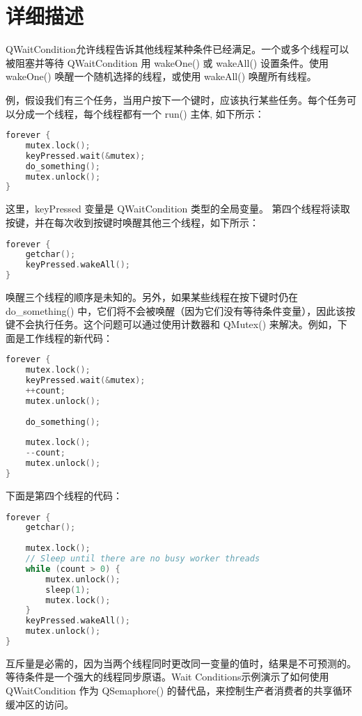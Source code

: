 \section{详细描述}

QWaitCondition允许线程告诉其他线程某种条件已经满足。一个或多个线程可以被阻塞并等待 QWaitCondition 用 wakeOne() 或 wakeAll() 设置条件。使用 wakeOne() 唤醒一个随机选择的线程，或使用 wakeAll() 唤醒所有线程。

例，假设我们有三个任务，当用户按下一个键时，应该执行某些任务。每个任务可以分成一个线程，每个线程都有一个 run() 主体, 如下所示：

\begin{lstlisting}[language=C++]
forever {
	mutex.lock();
	keyPressed.wait(&mutex);
	do_something();
	mutex.unlock();
}
\end{lstlisting}

这里，keyPressed 变量是 QWaitCondition 类型的全局变量。
第四个线程将读取按键，并在每次收到按键时唤醒其他三个线程，如下所示：

\begin{lstlisting}[language=C++]
forever {
	getchar();
	keyPressed.wakeAll();
}
\end{lstlisting}

唤醒三个线程的顺序是未知的。另外，如果某些线程在按下键时仍在 do\_something() 中，它们将不会被唤醒（因为它们没有等待条件变量），因此该按键不会执行任务。这个问题可以通过使用计数器和 QMutex() 来解决。例如，下面是工作线程的新代码：

\begin{lstlisting}[language=C++]
forever {
	mutex.lock();
	keyPressed.wait(&mutex);
	++count;
	mutex.unlock();
	
	do_something();
	
	mutex.lock();
	--count;
	mutex.unlock();
}
\end{lstlisting}

下面是第四个线程的代码：

\begin{lstlisting}[language=C++]
forever {
	getchar();
	
	mutex.lock();
	// Sleep until there are no busy worker threads
	while (count > 0) {
		mutex.unlock();
		sleep(1);
		mutex.lock();
	}
	keyPressed.wakeAll();
	mutex.unlock();
}
\end{lstlisting}

互斥量是必需的，因为当两个线程同时更改同一变量的值时，结果是不可预测的。
等待条件是一个强大的线程同步原语。Wait Conditions示例演示了如何使用 QWaitCondition 作为 QSemaphore() 的替代品，来控制生产者消费者的共享循环缓冲区的访问。

